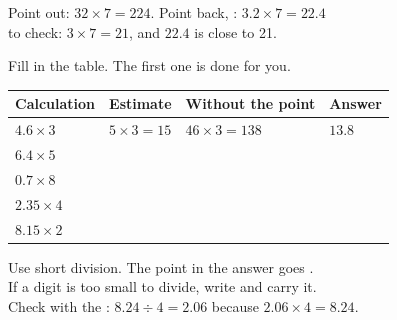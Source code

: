 \documentclass[12pt,a4paper]{article}
\newif\iffr
\newcommand{\fr}[1]{\unskip\iffr\par\vspace{1pt}\noindent{\small\itshape\color{black!60}#1}\par\fi}
\newcommand{\tall}{\rule[-0.6em]{0pt}{1.9em}}
\renewcommand{\tall}{\rule[-0.8em]{0pt}{2.4em}}
\begin{document}


\begin{remember}
  Point out: $32 \times 7 = 224$. \; Point back, : $3.2 \times 7 = 22.4$ \\
   to check: \; $3 \times 7 = 21$, and $22.4$ is close to 21.
  \fr{Multiplie sans la virgule, puis remets-la~: le r\'esultat a autant de chiffres
  apr\`es la virgule (\eng{decimal places}) que le nombre de d\'epart. V\'erifie
  avec une estimation (\eng{estimate}).}
\end{remember}

\vspace{2pt}
\noindent\begin{minipage}{\textwidth}
Fill in the table. The first one is done for you.
\fr{Compl\`ete le tableau. La premi\`ere ligne est faite pour toi.}

\vspace{4pt}
\noindent
\begin{tabularx}{\textwidth}{|C{2.6cm}|L|C{3.5cm}|C{2.4cm}|}
  \hline
  \textbf{Calculation} & \textbf{Estimate} & \textbf{Without the point} &
  \textbf{Answer} \\
  \hline
  $4.6 \times 3$ \tall & $5 \times 3 = 15$ & $46 \times 3 = 138$ & $13.8$ \\ \hline
  $6.4 \times 5$ \tall & & & \\ \hline
  $0.7 \times 8$ \tall & & & \\ \hline
  $2.35 \times 4$ \tall & & & \\ \hline
  $8.15 \times 2$ \tall & & & \\ \hline
\end{tabularx}
\end{minipage}


\begin{remember}
  Use short division. The point in the answer goes . \\
  If a digit is too small to divide, write  and carry it. \\
  Check with the : \; $8.24 \div 4 = 2.06$ \; because \;
  $2.06 \times 4 = 8.24$.
  \fr{Pose la division~: dans le quotient, la virgule monte tout droit
  (\eng{straight up}). Si un chiffre est trop petit pour \^etre divis\'e, \'ecris 0.
  V\'erifie avec l'op\'eration inverse (\eng{inverse calculation}).}
\end{remember}
\end{document}
